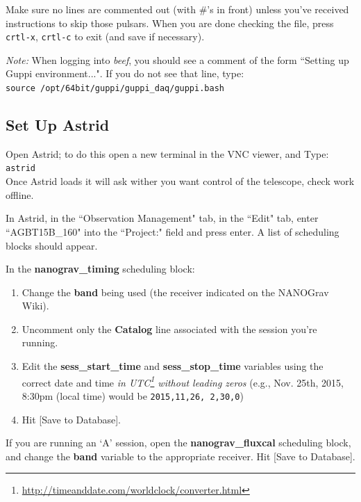 \documentclass[11pt, reqno, tbtags]{article}
\begin{document}
\noindent Make sure no lines are commented out (with \#'s in front) unless you've received instructions to skip those pulsars. When you are done checking the file, press \texttt{crtl-x}, \texttt{crtl-c} to exit (and save if necessary).  

\noindent\textit{Note:} When logging into \textit{beef}, you should see a comment of the form ``Setting up Guppi environment...".  If you do not see that line, type: \\
\indent\texttt{source /opt/64bit/guppi/guppi\_daq/guppi.bash}

\subsection{Set Up Astrid}\label{ssec:astrid}  %
Open Astrid; to do this open a new terminal in the VNC viewer, and Type: \\
\indent\texttt{astrid} \\
Once Astrid loads it will ask wither you want control of the telescope, check work offline.

\noindent In Astrid, in the ``Observation Management" tab, in the ``Edit" tab, enter ``AGBT15B\_160" into the ``Project:" field and press enter. A list of scheduling blocks should appear. 

\noindent In the \textbf{nanograv\_timing} scheduling block: \begin{enumerate}
 \item Change the \textbf{band} being used (the receiver indicated on the NANOGrav Wiki).  
 \item Uncomment only the \textbf{Catalog} line associated with the session you're running.  
 \item Edit the \textbf{sess\_start\_time} and \textbf{sess\_stop\_time} variables using the correct date and time \textit{in UTC\footnote{\url{http://timeanddate.com/worldclock/converter.html}} without leading zeros} (e.g., Nov. 25th, 2015, 8:30pm (local time) would be \texttt{2015,11,26, 2,30,0}) 
 \item Hit [Save to Database].
\end{enumerate}

\noindent If you are running an `A' session, open the \textbf{nanograv\_fluxcal} scheduling block, and change the \textbf{band} variable to the appropriate receiver.  Hit [Save to Database].
\end{document}

